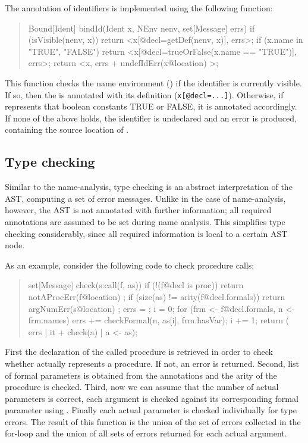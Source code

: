The annotation of identifiers is implemented using the following
function: 
\begin{quote}\small
\begin{rascal}
Bound[Ident] bindId(Ident x, NEnv nenv, set[Message] errs) {
  if (isVisible(nenv, x))
    return <x[@decl=getDef(nenv, x)], errs>;  
  if (x.name in {"TRUE", "FALSE"})
    return <x[@decl=trueOrFalse(x.name == "TRUE")], errs>;
  return <x, errs + { undefIdErr(x@location) }>;
}
\end{rascal}
\end{quote}
This function checks the name environment () if the
identifier  is currently visible. If so, then the
 is annotated with its definition
(\texttt{x[@decl=...]}). Otherwise, if  represents that
boolean constants TRUE or FALSE, it is annotated accordingly. If none
of the above holds, the identifier is undeclared and an error is
produced, containing the source location of .

\subsection{Type checking}

\noindent Similar to the name-analysis, type checking is an abstract
interpretation of the AST, computing a set of error messages. Unlike
in the case of name-analysis, however, the AST is not annotated with
further information; all required annotations are assumed to be set
during name analysis. This simplifies type checking considerably,
since all required information is local to a certain AST node.

As an example, consider the following code to check procedure calls:
\begin{quote}
\begin{rascal}
set[Message] check(s:call(f, as)) {
  if (!(f@decl is proc)) 
    return { notAProcErr(f@location) };
  if (size(as) != arity(f@decl.formals)) 
    return { argNumErr(s@location) };
  errs = {}; i = 0;
  for (frm <- f@decl.formals, n <- frm.names) {
    errs += checkFormal(n, as[i], frm.hasVar);
    i += 1;
  }
  return ( errs | it + check(a) | a <- as);
}
\end{rascal}
\end{quote}
First the declaration of the called procedure is retrieved in order to
check whether  actually represents a procedure. If not, an
error is returned. Second, list of formal parameters is obtained from
the  annotations and the arity of the procedure is
checked. Third, now we can assume that the number of actual parameters
is correct, each argument is checked against its corresponding formal
parameter using . Finally each actual parameter
is checked individually for type errors. The result of this function
is the union of the set of errors collected in the for-loop and the
union of all sets of errors returned for each actual argument.


